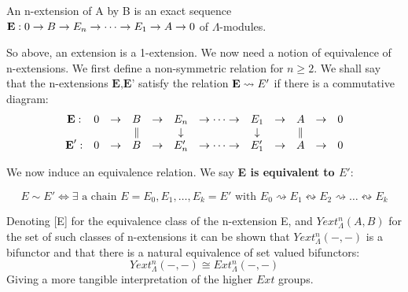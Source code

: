 An n-extension of A by B is an exact sequence $\textbf E :
0\rightarrow B\rightarrow E_n \rightarrow \dots \rightarrow E_1
\rightarrow A \rightarrow 0 $ of $\Lambda$-modules.

So above, an extension is a 1-extension. We now need a notion of
equivalence of n-extensions. We first define a non-symmetric
relation for $n\geq 2$. We shall say that the n-extensions
$\textbf {E,E'}$ satisfy the relation $\textbf E \rightsquigarrow
E'$ if there is a commutative diagram:
$$\begin{array}{cccccccccccc}
  \textbf E :  & 0 & \rightarrow & B         & \rightarrow & E_n        & \rightarrow \dots \rightarrow & E_1        & \rightarrow & A & \rightarrow & 0 \\
               &   &             & \parallel &             & \downarrow &                               & \downarrow &             & \parallel &  &  \\
  \textbf E' : & 0 & \rightarrow & B         & \rightarrow & E'_n       & \rightarrow \dots \rightarrow & E'_1       & \rightarrow & A & \rightarrow & 0 \\
\end{array}$$

We now induce an equivalence relation. We say \textbf{E is
equivalent to $E'$}:

$$E \sim E' \Longleftrightarrow \exists \text{ a chain } E=E_0,
E_1, \dots , E_k = E' \text{ with } E_0\rightsquigarrow E_1
\leftrightsquigarrow E_2 \rightsquigarrow \dots
\leftrightsquigarrow E_k$$

Denoting [E] for the equivalence class of the n-extension E, and
$Yext^n_\Lambda (A,B)$ for the set of such classes of n-extensions
it can be shown that $Yext^n_\Lambda (-,-)$ is a bifunctor and
that there is a natural equivalence of set valued bifunctors:
$$Yext^n_\Lambda (-,-)\cong Ext^n_\Lambda (-,-)$$
Giving a more tangible interpretation of the higher $Ext$ groups.





